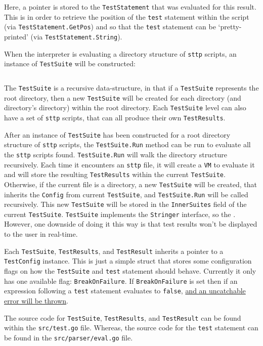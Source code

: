 Here, a pointer is stored to the \verb|TestStatement| that was evaluated for this result. This is in order to retrieve the position of the \verb|test| statement within the script (via \verb|TestStatement.GetPos|) and so that the \verb|test| statement can be `pretty-printed' (via \verb|TestStatement.String|).

When the interpreter is evaluating a directory structure of \verb|sttp| scripts, an instance of \verb|TestSuite| will be constructed:

\inputminted[firstline=76, lastline=86, autogobble, breaklines, tabsize=4]{go}{../../src/test.go}

The \verb|TestSuite| is a recursive data-structure, in that if a \verb|TestSuite| represents the root directory, then a new \verb|TestSuite| will be created for each directory (and directory's directory) within the root directory. Each \verb|TestSuite| level can also have a set of \verb|sttp| scripts, that can all produce their own \verb|TestResults|.

After an instance of \verb|TestSuite| has been constructed for a root directory structure of \verb|sttp| scripts, the \verb|TestSuite.Run| method can be run to evaluate all the \verb|sttp| scripts found. \verb|TestSuite.Run| will walk the directory structure recursively. Each time it encounters an \verb|sttp| file, it will create a \verb|VM| to evaluate it and will store the resulting \verb|TestResults| within the current \verb|TestSuite|. Otherwise, if the current file is a directory, a new \verb|TestSuite| will be created, that inherits the \verb|Config| from current \verb|TestSuite|, and \verb|TestSuite.Run| will be called recursively. This new \verb|TestSuite| will be stored in the \verb|InnerSuites| field of the current \verb|TestSuite|. \verb|TestSuite| implements the \verb|Stringer| interface, so the . However, one downside of doing it this way is that test results won't be displayed to the user in real-time.

Each \verb|TestSuite|, \verb|TestResults|, and \verb|TestResult| inherits a pointer to a \verb|TestConfig| instance. This is just a simple struct that stores some configuration flags on how the \verb|TestSuite| and \verb|test| statement should behave. Currently it only has one available flag: \verb|BreakOnFailure|. If \verb|BreakOnFailure| is set then if an expression following a \verb|test| statement evaluates to \verb|false|, \hyperref[sec:development-try-catch-throw-errors-context]{and an uncatchable error will be thrown}.

The source code for \verb|TestSuite|, \verb|TestResults|, and \verb|TestResult| can be found within the \verb|src/test.go| file. Whereas, the source code for the \verb|test| statement can be found in the \verb|src/parser/eval.go| file.

